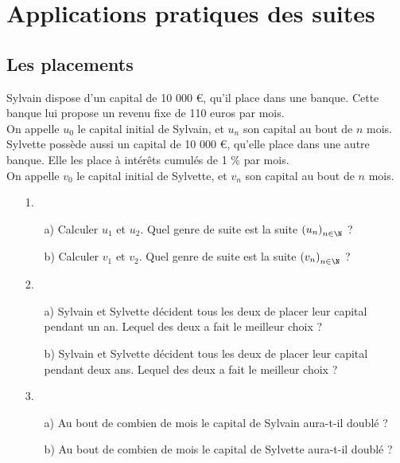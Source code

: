 \section{Applications pratiques des suites}

\subsection{Les placements}

Sylvain dispose d'un capital de 10 000 €, qu'il place dans une banque. Cette banque lui propose un revenu fixe de 110 euros par mois. \\ On appelle $u_0$ le capital initial de Sylvain, et $u_n$ son capital au bout de $n$ mois. \\

Sylvette possède aussi un capital de 10 000 €, qu'elle place dans une autre banque. Elle les place à intérêts cumulés de 1 \% par mois. \\ On appelle $v_0$ le capital initial de Sylvette, et $v_n$ son capital au bout de $n$ mois. \\

\begin{itemize}
\item[1.]
\begin{itemize}
\item[a)] Calculer $u_1$ et $u_2$. Quel genre de suite est la suite $\left(u_n\right)_{n \in \N} $ ? \\
\item[b)] Calculer $v_1$ et $v_2$. Quel genre de suite est la suite $\left(v_n\right)_{n \in \N} $ ? \\
\end{itemize}
\item[2.]
\begin{itemize}
\item[a)] Sylvain et Sylvette décident tous les deux de placer leur capital pendant un an. Lequel des deux a fait le meilleur choix ? \\
\item[b)] Sylvain et Sylvette décident tous les deux de placer leur capital pendant deux ans. Lequel des deux a fait le meilleur choix ? \\
\end{itemize}
\item[3.] 
\begin{itemize}
\item[a)] Au bout de combien de mois le capital de Sylvain aura-t-il doublé ?
\item[b)] Au bout de combien de mois le capital de Sylvette aura-t-il doublé ?
\end{itemize} 
\end{itemize}

